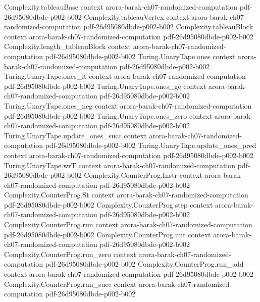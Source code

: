 \begin{theorem}
\proofstep
  {Complexity.tableauBase}
  {context}
  {arora-barak-ch07-randomized-computation}
  {pdf-26d95080dbde-p002-b002}
\proofstep
  {Complexity.tableauVertex}
  {context}
  {arora-barak-ch07-randomized-computation}
  {pdf-26d95080dbde-p002-b002}
\proofstep
  {Complexity.tableauBlock}
  {context}
  {arora-barak-ch07-randomized-computation}
  {pdf-26d95080dbde-p002-b002}
\proofstep
  {Complexity.length_tableauBlock}
  {context}
  {arora-barak-ch07-randomized-computation}
  {pdf-26d95080dbde-p002-b002}
\proofstep
  {Turing.UnaryTape.ones}
  {context}
  {arora-barak-ch07-randomized-computation}
  {pdf-26d95080dbde-p002-b002}
\proofstep
  {Turing.UnaryTape.ones_lt}
  {context}
  {arora-barak-ch07-randomized-computation}
  {pdf-26d95080dbde-p002-b002}
\proofstep
  {Turing.UnaryTape.ones_ge}
  {context}
  {arora-barak-ch07-randomized-computation}
  {pdf-26d95080dbde-p002-b002}
\proofstep
  {Turing.UnaryTape.ones_neg}
  {context}
  {arora-barak-ch07-randomized-computation}
  {pdf-26d95080dbde-p002-b002}
\proofstep
  {Turing.UnaryTape.ones_zero}
  {context}
  {arora-barak-ch07-randomized-computation}
  {pdf-26d95080dbde-p002-b002}
\proofstep
  {Turing.UnaryTape.update_ones_succ}
  {context}
  {arora-barak-ch07-randomized-computation}
  {pdf-26d95080dbde-p002-b002}
\proofstep
  {Turing.UnaryTape.update_ones_pred}
  {context}
  {arora-barak-ch07-randomized-computation}
  {pdf-26d95080dbde-p002-b002}
\proofstep
  {Turing.UnaryTape.wrT}
  {context}
  {arora-barak-ch07-randomized-computation}
  {pdf-26d95080dbde-p002-b002}
\proofstep
  {Complexity.CounterProg.Instr}
  {context}
  {arora-barak-ch07-randomized-computation}
  {pdf-26d95080dbde-p002-b002}
\proofstep
  {Complexity.CounterProg.St}
  {context}
  {arora-barak-ch07-randomized-computation}
  {pdf-26d95080dbde-p002-b002}
\proofstep
  {Complexity.CounterProg.step}
  {context}
  {arora-barak-ch07-randomized-computation}
  {pdf-26d95080dbde-p002-b002}
\proofstep
  {Complexity.CounterProg.run}
  {context}
  {arora-barak-ch07-randomized-computation}
  {pdf-26d95080dbde-p002-b002}
\proofstep
  {Complexity.CounterProg.init}
  {context}
  {arora-barak-ch07-randomized-computation}
  {pdf-26d95080dbde-p002-b002}
\proofstep
  {Complexity.CounterProg.run_zero}
  {context}
  {arora-barak-ch07-randomized-computation}
  {pdf-26d95080dbde-p002-b002}
\proofstep
  {Complexity.CounterProg.run_add}
  {context}
  {arora-barak-ch07-randomized-computation}
  {pdf-26d95080dbde-p002-b002}
\proofstep
  {Complexity.CounterProg.run_succ}
  {context}
  {arora-barak-ch07-randomized-computation}
  {pdf-26d95080dbde-p002-b002}
\proofstep

\end{theorem}
